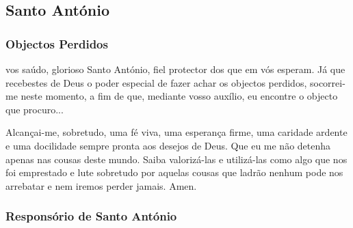 \subsection{Santo António}

\subsubsection{Objectos Perdidos}
 vos saúdo, glorioso Santo António, fiel protector dos que em vós esperam. Já que recebestes de Deus o poder especial de fazer achar os objectos perdidos, socorrei-me neste momento, a fim de que, mediante vosso auxílio, eu encontre o objecto que procuro...\par
Alcançai-me, sobretudo, uma fé viva, uma esperança firme, uma caridade ardente e uma docilidade sempre pronta aos desejos de Deus. Que eu me não detenha apenas nas cousas deste mundo. Saiba valorizá-las e utilizá-las como algo que nos foi emprestado e lute sobretudo por aquelas cousas que ladrão nenhum pode nos arrebatar e nem iremos perder jamais. Amen.

\subsubsection{Responsório de Santo António}\label{respstantonio}

